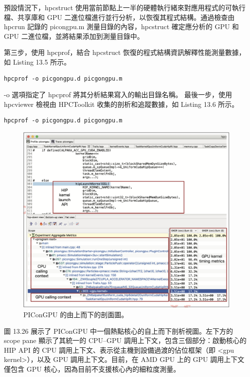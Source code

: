 預設情況下，hpcstruct 使用當前節點上一半的硬體執行緒來對應用程式的可執行檔、共享庫和 GPU 二進位檔進行並行分析，以恢復其程式結構。通過檢查由 hpcrun 記錄的 picongpu.m 測量目錄的內容，hpcstruct 確定應分析的 GPU 和 GPU 二進位檔，並將結果添加到測量目錄中。

第三步，使用 hpcprof，結合 hpcstruct 恢復的程式結構資訊解釋性能測量數據，如 Listing 13.5 所示。

\begin{lstlisting}[caption={Listing 13.5: Example of the hpcprof command.}]
hpcprof -o picgongpu.d picgongpu.m
\end{lstlisting}

-o 選項指定了 hpcprof 將其分析結果寫入的輸出目錄名稱。
最後一步，使用 hpcviewer 檢視由 HPCToolkit 收集的剖析和追蹤數據，如 Listing 13.6 所示。

\begin{lstlisting}[caption={Listing 13.6: Example of the hpcviewer command.}]
hpcprof -o picgongpu.d picgongpu.m
\end{lstlisting}

\begin{figure}
    \centering
    \includegraphics[width=0.9\linewidth]{FileAusiliari/Screenshots/Figure13-26.png}
    \caption{PIConGPU 的由上而下的剖面圖。}
    \label{fig:PAPI26}
\end{figure}

圖 13.26 展示了 PIConGPU 中一個熱點核心的自上而下剖析視圖。左下方的 scope pane 顯示了其統一的 CPU–GPU 調用上下文，包含三個部分：啟動核心的 HIP API 的 CPU 調用上下文、表示從主機到設備過渡的佔位框架（即 <gpu kernel>），以及 GPU 調用上下文。目前，在 AMD GPU 上的 GPU 調用上下文僅包含 GPU 核心，因為目前不支援核心內的細粒度測量。

